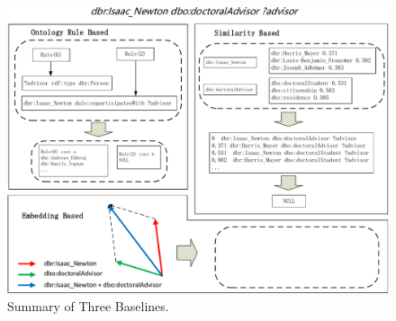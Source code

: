 \documentclass[runningheads]{llncs}
\begin{document}
\begin{figure}
\includegraphics[width=\textwidth]{summary_three_cropped.pdf}
\caption{Summary of Three Baselines.} \label{summary_three}
\end{figure}



\end{document}
